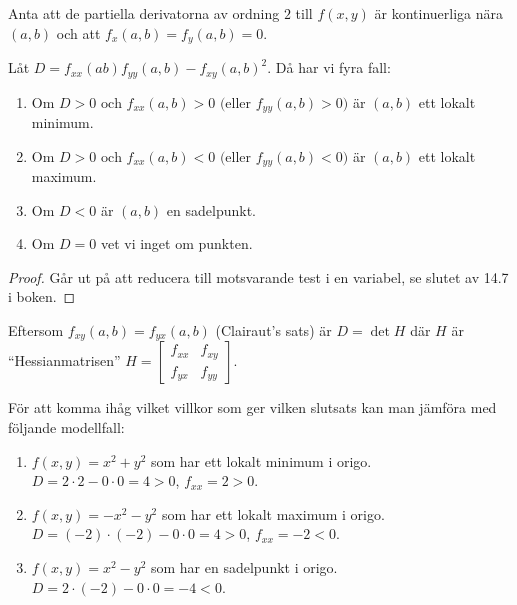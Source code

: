 \documentclass[a4paper]{article}
\begin{document}
\begin{sats}
    Anta att de partiella derivatorna av ordning \(
        2
    \) till \(
        f(x,y)
    \) är kontinuerliga nära \(
        (a,b)
    \) och att \(
        f_x(a,b) = f_y(a,b) = 0
    \).

    Låt \(
        D = f_{xx}(ab)f_{yy}(a,b)-{f_{xy}(a,b)}^2
    \). Då har vi fyra fall:

    \begin{enumerate}
        \item Om \(
            D > 0 \text{ och } f_{xx}(a,b) > 0\text{ (eller } f_{yy}(a,b) > 0\text{)}  
        \) är \(
            (a,b)
        \) ett lokalt minimum.

        \item Om \(
            D > 0 \text{ och } f_{xx}(a,b) < 0\text{ (eller } f_{yy}(a,b) < 0\text{)}  
        \) är \(
            (a,b)
        \) ett lokalt maximum.
    
        \item Om \(
            D < 0
        \) är \(
            (a,b)
        \) en sadelpunkt.

        \item Om \(
            D = 0
        \) vet vi inget om punkten.
    \end{enumerate}

    \begin{proof}
        Går ut på att reducera till motsvarande test i en variabel, se slutet 
        av 14.7 i boken.
    \end{proof}
\end{sats}

Eftersom \(
    f_{xy}(a,b) = f_{yx}(a,b)
\) (Clairaut's sats) är \(
    D = \det{H}
\) där \(
    H 
\) är \enquote{Hessianmatrisen} \(
    H = 
    \begin{bmatrix}
        f_{xx} & f_{xy}\\ 
        f_{yx} &f_{yy} 
    \end{bmatrix}
\).

För att komma ihåg vilket villkor som ger vilken slutsats kan man jämföra med
följande modellfall:
\begin{enumerate}
    \item \(
        f(x,y) = x^2+y^2
    \) som har ett lokalt minimum i origo. \(
        D = 2\cdot 2 - 0 \cdot 0 = 4 > 0
    \), \(
        f_{xx} = 2 > 0
    \).

    \item \(
        f(x,y) = -x^2-y^2
    \) som har ett lokalt maximum i origo. \(
        D = (-2)\cdot(-2) - 0 \cdot 0 = 4 > 0
    \), \(
        f_{xx} = -2 < 0
    \).

    \item \(
        f(x,y) = x^2-y^2
    \) som har en sadelpunkt i origo. \(
        D = 2\cdot (-2) - 0 \cdot 0 = -4 < 0
    \).
\end{enumerate}
\end{document}
